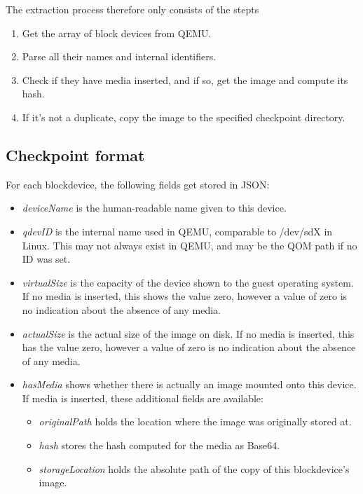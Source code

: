 The extraction process therefore only consists of the stepts
\begin{enumerate}
    \item Get the array of block devices from QEMU.
    \item Parse all their names and internal identifiers.
    \item Check if they have media inserted, and if so, get the image and compute its hash.
    \item If it's not a duplicate, copy the image to the specified checkpoint directory.
\end{enumerate}

\subsection{Checkpoint format}
For each blockdevice, the following fields get stored in JSON:
\begin{itemize}
    \item \emph{deviceName} is the human-readable name given to this device.
    \item \emph{qdevID} is the internal name used in QEMU, comparable to /dev/sdX in Linux.
    This may not always exist in QEMU, and may be the QOM path if no ID was set.
    \item \emph{virtualSize} is the capacity of the device shown to the guest operating system.
    If no media is inserted, this shows the value zero,
    however a value of zero is no indication about the absence of any media.
    \item \emph{actualSize} is the actual size of the image on disk.
    If no media is inserted, this has the value zero,
    however a value of zero is no indication about the absence of any media.
    \item \emph{hasMedia} shows whether there is actually an image mounted onto this device.
    If media is inserted, these additional fields are available:
    \begin{itemize}
        \item \emph{originalPath} holds the location where the image was originally stored at.
        \item \emph{hash} stores the hash computed for the media as Base64.
        \item \emph{storageLocation} holds the absolute path of the copy of this blockdevice's image.
    \end{itemize}
\end{itemize}

